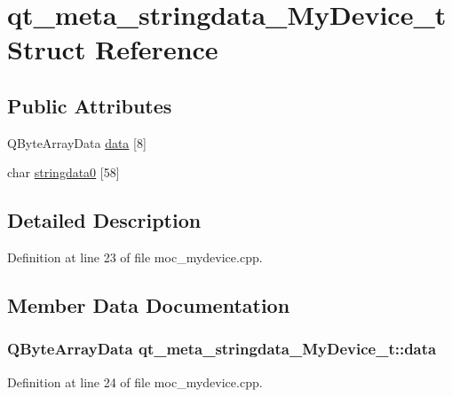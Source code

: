 \hypertarget{structqt__meta__stringdata___my_device__t}{\section{qt\+\_\+meta\+\_\+stringdata\+\_\+\+My\+Device\+\_\+t Struct Reference}
\label{structqt__meta__stringdata___my_device__t}
}
\subsection*{Public Attributes}
\begin{DoxyCompactItemize}
\item 
Q\+Byte\+Array\+Data \hyperlink{structqt__meta__stringdata___my_device__t_abbaa330742df766fe3dba9f355ec3cbc}{data} \mbox{[}8\mbox{]}
\item 
char \hyperlink{structqt__meta__stringdata___my_device__t_af8cfff3ab861a8d6e52b4e876dbb73e6}{stringdata0} \mbox{[}58\mbox{]}
\end{DoxyCompactItemize}


\subsection{Detailed Description}


Definition at line 23 of file moc\+\_\+mydevice.\+cpp.



\subsection{Member Data Documentation}
\hypertarget{structqt__meta__stringdata___my_device__t_abbaa330742df766fe3dba9f355ec3cbc}{
\subsubsection[{data}]{\setlength{\rightskip}{0pt plus 5cm}Q\+Byte\+Array\+Data qt\+\_\+meta\+\_\+stringdata\+\_\+\+My\+Device\+\_\+t\+::data}}\label{structqt__meta__stringdata___my_device__t_abbaa330742df766fe3dba9f355ec3cbc}


Definition at line 24 of file moc\+\_\+mydevice.\+cpp.

